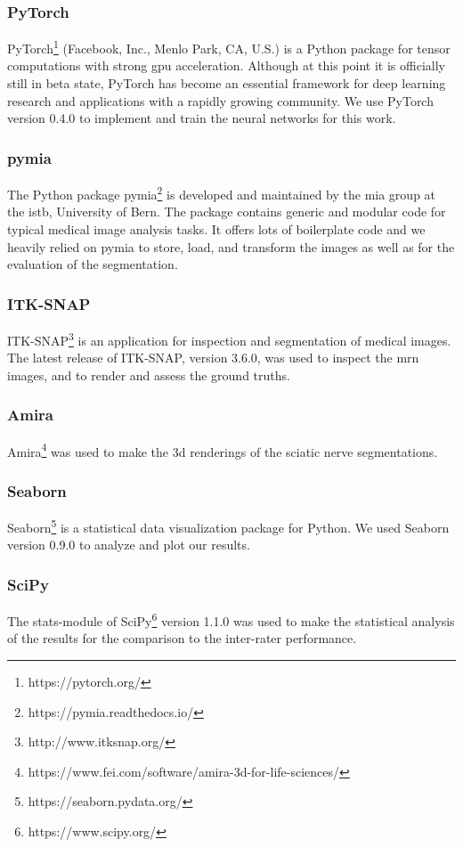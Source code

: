 \subsubsection{PyTorch}
PyTorch\footnote{https://pytorch.org/} (Facebook, Inc., Menlo Park, CA, U.S.) is a Python package for tensor computations with strong \gls{gpu} acceleration. Although at this point it is officially still in beta state, PyTorch has become an essential framework for deep learning research and applications with a rapidly growing community. We use PyTorch version 0.4.0 to implement and train the neural networks for this work.
\subsubsection{pymia}
The Python package pymia\footnote{https://pymia.readthedocs.io/} is developed and maintained by the \gls{mia} group at the \gls{istb}, University of Bern. The package contains generic and modular code for typical medical image analysis tasks. It offers lots of boilerplate code and we heavily relied on pymia to store, load, and transform the images as well as for the evaluation of the segmentation.
\subsubsection{ITK-SNAP}
ITK-SNAP\footnote{http://www.itksnap.org/} \cite{py06nimg} is an application for inspection and segmentation of medical images. The latest release of ITK-SNAP, version 3.6.0, was used to inspect the \gls{mrn} images, and to render and assess the ground truths.
\subsubsection{Amira}
Amira\footnote{https://www.fei.com/software/amira-3d-for-life-sciences/} was used to make the \gls{3d} renderings of the sciatic nerve segmentations.
\subsubsection{Seaborn}
Seaborn\footnote{https://seaborn.pydata.org/} is a statistical data visualization package for Python. We used Seaborn version 0.9.0 to analyze and plot our results.
\subsubsection{SciPy}
The stats-module of SciPy\footnote{https://www.scipy.org/} version 1.1.0 was used to make the statistical analysis of the results for the comparison to the inter-rater performance.

